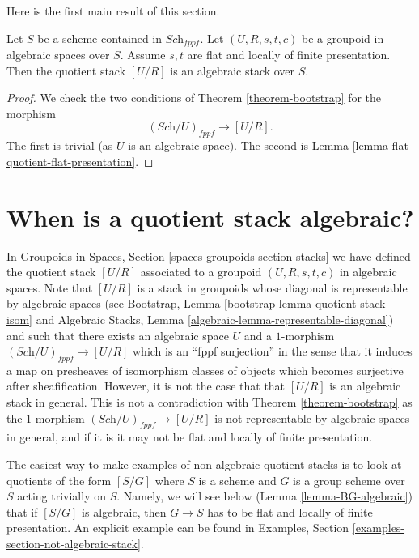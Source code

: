 \noindent
Here is the first main result of this section.

\begin{theorem}
\label{theorem-flat-groupoid-gives-algebraic-stack}
Let $S$ be a scheme contained in $\textit{Sch}_{fppf}$.
Let $(U, R, s, t, c)$ be a groupoid in algebraic spaces over $S$.
Assume $s, t$ are flat and locally of finite presentation.
Then the quotient stack $[U/R]$ is an algebraic stack over $S$.
\end{theorem}

\begin{proof}
We check the two conditions of
Theorem \ref{theorem-bootstrap}
for the morphism
$$
(\textit{Sch}/U)_{fppf} \longrightarrow [U/R].
$$
The first is trivial (as $U$ is an algebraic space).
The second is
Lemma \ref{lemma-flat-quotient-flat-presentation}.
\end{proof}









\section{When is a quotient stack algebraic?}
\label{section-quotient-algebraic}

\noindent
In
Groupoids in Spaces, Section \ref{spaces-groupoids-section-stacks}
we have defined the quotient stack $[U/R]$ associated to a groupoid
$(U, R, s, t, c)$ in algebraic spaces. Note that $[U/R]$ is a stack
in groupoids whose diagonal is representable by algebraic spaces (see
Bootstrap, Lemma \ref{bootstrap-lemma-quotient-stack-isom}
and
Algebraic Stacks, Lemma \ref{algebraic-lemma-representable-diagonal})
and such that there exists an algebraic space $U$ and a $1$-morphism
$(\textit{Sch}/U)_{fppf} \to [U/R]$ which is an ``fppf surjection''
in the sense that it induces a map on presheaves of isomorphism classes of
objects which becomes surjective after sheafification.
However, it is not the case that that $[U/R]$ is an algebraic
stack in general. This is not a contradiction with
Theorem \ref{theorem-bootstrap}
as the $1$-morphism $(\textit{Sch}/U)_{fppf} \to [U/R]$ is not
representable by algebraic spaces in general, and if it is it may not
be flat and locally of finite presentation.

\medskip\noindent
The easiest way to make examples of non-algebraic quotient stacks is
to look at quotients of the form $[S/G]$ where $S$ is a scheme and $G$
is a group scheme over $S$ acting trivially on $S$. Namely, we will see
below
(Lemma \ref{lemma-BG-algebraic})
that if $[S/G]$ is algebraic, then $G \to S$ has to be flat and locally
of finite presentation. An explicit example can be found in
Examples, Section \ref{examples-section-not-algebraic-stack}.

